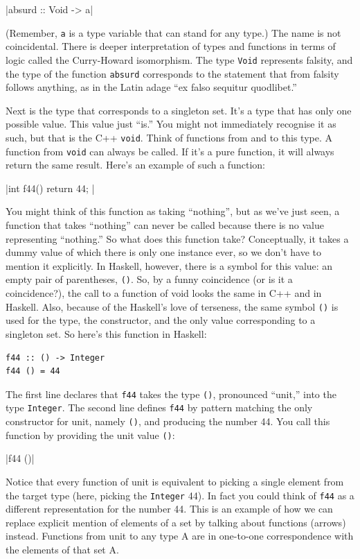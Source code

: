 |absurd :: Void -> a|

(Remember, \texttt{a} is a type variable that can stand for any type.)
The name is not coincidental. There is deeper interpretation of types
and functions in terms of logic called the Curry-Howard isomorphism. The
type \texttt{Void} represents falsity, and the type of the function
\texttt{absurd} corresponds to the statement that from falsity follows
anything, as in the Latin adage ``ex falso sequitur quodlibet.''

Next is the type that corresponds to a singleton set. It's a type that
has only one possible value. This value just ``is.'' You might not
immediately recognise it as such, but that is the C++ \texttt{void}.
Think of functions from and to this type. A function from \texttt{void}
can always be called. If it's a pure function, it will always return the
same result. Here's an example of such a function:

|int f44() { return 44; }|

You might think of this function as taking ``nothing'', but as we've
just seen, a function that takes ``nothing'' can never be called because
there is no value representing ``nothing.'' So what does this function
take? Conceptually, it takes a dummy value of which there is only one
instance ever, so we don't have to mention it explicitly. In Haskell,
however, there is a symbol for this value: an empty pair of parentheses,
\texttt{()}. So, by a funny coincidence (or is it a coincidence?), the
call to a function of void looks the same in C++ and in Haskell. Also,
because of the Haskell's love of terseness, the same symbol \texttt{()}
is used for the type, the constructor, and the only value corresponding
to a singleton set. So here's this function in Haskell:

\begin{verbatim}
f44 :: () -> Integer
f44 () = 44
\end{verbatim}

The first line declares that \texttt{f44} takes the type \texttt{()},
pronounced ``unit,'' into the type \texttt{Integer}. The second line
defines \texttt{f44} by pattern matching the only constructor for unit,
namely \texttt{()}, and producing the number 44. You call this function
by providing the unit value \texttt{()}:

|f44 ()|

Notice that every function of unit is equivalent to picking a single
element from the target type (here, picking the \texttt{Integer} 44). In
fact you could think of \texttt{f44} as a different representation for
the number 44. This is an example of how we can replace explicit mention
of elements of a set by talking about functions (arrows) instead.
Functions from unit to any type A are in one-to-one correspondence with
the elements of that set A.

